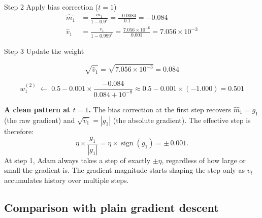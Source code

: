 \documentclass[12pt, a4paper]{article}
\newif\ifstudentmode
\newcommand{\sol}[2][6cm]{%
  \ifstudentmode
    \underline{\hspace{#1}}%
  \else
    {#2}%
  \fi
}
\theoremstyle{definition}
\begin{document}
\vspace{0.8em}

\begin{stepbox}{Step 2 \quad Apply bias correction ($t = 1$)}
  \begin{align*}
    \hat{m}_1 & = \frac{m_1}{1 - 0.9^1}
    = \frac{-0.0084}{0.1}
    = \sol[4cm]{-0.084}                   \\[6pt]
    \hat{v}_1 & = \frac{v_1}{1 - 0.999^1}
    = \frac{7.056 \times 10^{-6}}{0.001}
    = \sol[4cm]{7.056 \times 10^{-3}}
  \end{align*}
\end{stepbox}

\vspace{0.8em}

\begin{stepbox}{Step 3 \quad Update the weight}

  \[
    \sqrt{\hat{v}_1} = \sqrt{7.056 \times 10^{-3}}
    = \sol[3cm]{0.084}
  \]

  \[
    w^{(2)}_1 \;\longleftarrow\;
    0.5 - 0.001 \times \frac{-0.084}{0.084 + 10^{-8}}
    \approx 0.5 - 0.001 \times (-1.000)
    = \sol[3cm]{0.501}
  \]
\end{stepbox}

\vspace{0.5em}

\begin{notebox}
  \textbf{A clean pattern at $t = 1$.}
  The bias correction at the first step recovers $\hat{m}_1 = g_1$ (the raw
  gradient) and $\sqrt{\hat{v}_1} = |g_1|$ (the absolute gradient).  The
  effective step is therefore:
  \[
    \eta \times \frac{g_1}{|g_1|} = \eta \times \operatorname{sign}(g_1)
    = \pm\, 0.001.
  \]
  At step 1, Adam always takes a step of exactly $\pm\eta$, regardless of how
  large or small the gradient is.  The gradient magnitude starts shaping the
  step only as $v_t$ accumulates history over multiple steps.
\end{notebox}

\subsection*{Comparison with plain gradient descent}
\end{document}

